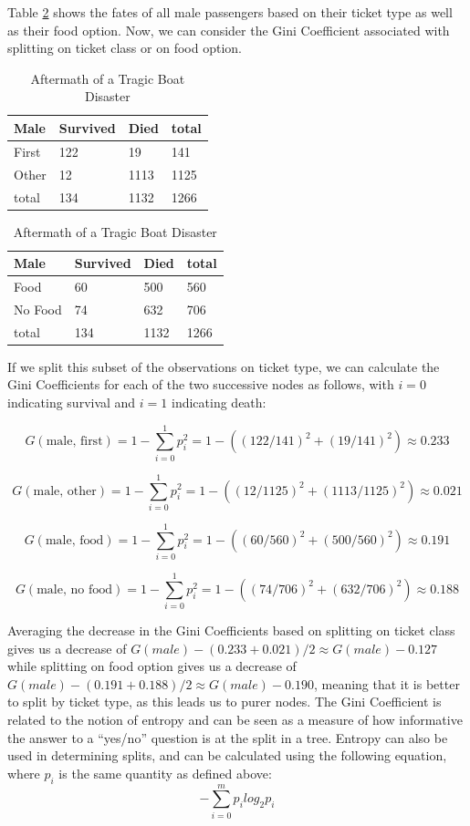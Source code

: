 \documentclass[preprint,12pt]{elsarticle}
\begin{document}
Table \ref{hello} shows the fates of all male passengers based on their ticket type as well as their food option. Now, we can consider the Gini Coefficient associated with splitting on ticket class or on food option.
\begin{table}[h]
\begin{tabular}{|l | l l | l|}
\hline
 Male & Survived & Died & total\\
\hline
First & 122 & 19 & 141 \\
Other & 12 & 1113 & 1125 \\
\hline
total & 134 & 1132 & 1266 \\
\hline
\end{tabular}
\quad
\begin{tabular}{|l | l l | l|}
\hline
Male & Survived & Died & total\\
\hline
Food & 60 & 500  & 560 \\
No Food & 74 & 632 & 706 \\
\hline
total & 134 & 1132 & 1266 \\
\hline
\end{tabular}
\caption{Aftermath of a Tragic Boat Disaster}
\label{hello}
\end{table}

\noindent If we split this subset of the observations on ticket type, we can calculate the Gini Coefficients for each of the two successive nodes as follows, with $i=0$ indicating survival and $i=1$ indicating death:

$$G(\textrm{male, first}) = 1 - \sum\limits_{i=0}^1 p_{i}^{2} = 1 - ((122/141)^{2}+(19/141)^{2}) \approx 0.233 $$

$$G(\textrm{male, other}) = 1 - \sum\limits_{i=0}^1 p_{i}^{2} = 1 - ((12/1125)^{2}+(1113/1125)^{2}) \approx 0.021 $$

$$G(\textrm{male, food}) = 1 - \sum\limits_{i=0}^1 p_{i}^{2} = 1 - ((60/560)^{2}+(500/560)^{2}) \approx 0.191 $$

$$G(\textrm{male, no food}) = 1 - \sum\limits_{i=0}^1 p_{i}^{2} = 1 - ((74/706)^{2}+(632/706)^{2}) \approx 0.188 $$

\noindent Averaging the decrease in the Gini Coefficients based on splitting on ticket class gives us a decrease of $G(male) - (0.233+0.021)/2 \approx G(male) - 0.127$ while splitting on food option gives us a decrease of  $G(male) - (0.191+0.188)/2 \approx G(male) - 0.190$, meaning that it is better to split by ticket type, as this leads us to purer nodes. The Gini Coefficient is related to the notion of entropy and can be seen as a measure of how informative the answer to a ``yes/no'' question is at the split in a tree. Entropy can also be used in determining splits, and can be calculated using the following equation, where $p_{i}$ is the same quantity as defined above: 
$$-\sum\limits_{i=0}^m p_{i}log_{2}p_{i}$$
\end{document}
